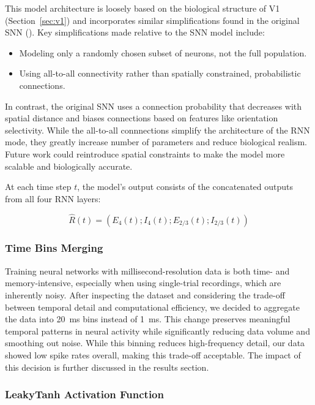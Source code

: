 This model architecture is loosely based on the biological structure of V1 (Section~\ref{sec:v1}) and incorporates similar simplifications found in the original SNN (\citet{antolik2024comprehensive}). Key simplifications made relative to the SNN model include:
\begin{itemize}
    \item Modeling only a randomly chosen subset of neurons, not the full population.
    \item Using all-to-all connectivity rather than spatially constrained, probabilistic connections.
\end{itemize}

In contrast, the original SNN uses a connection probability that decreases with spatial distance and biases connections based on features like orientation selectivity. While the all-to-all connnections simplify the architecture of the RNN mode, they greatly increase number of parameters and reduce biological realism. Future work could reintroduce spatial constraints to make the model more scalable and biologically accurate.

At each time step $t$, the model's output consists of the concatenated outputs from all four RNN layers:

$$\hat{R}(t) = (E_4(t); I_4(t); E_{2/3}(t); I_{2/3}(t))$$

\subsubsection{Time Bins Merging}
\label{subsubsec:time_bins_merging}

Training neural networks with millisecond-resolution data is both time- and memory-intensive, especially when using single-trial recordings, which are inherently noisy. After inspecting the dataset and considering the trade-off between temporal detail and computational efficiency, we decided to aggregate the data into 20~ms bins instead of 1~ms. This change preserves meaningful temporal patterns in neural activity while significantly reducing data volume and smoothing out noise. While this binning reduces high-frequency detail, our data showed low spike rates overall, making this trade-off acceptable. The impact of this decision is further discussed in the results section.

\subsubsection{LeakyTanh Activation Function}
\label{subsubsec:leakytanh}

